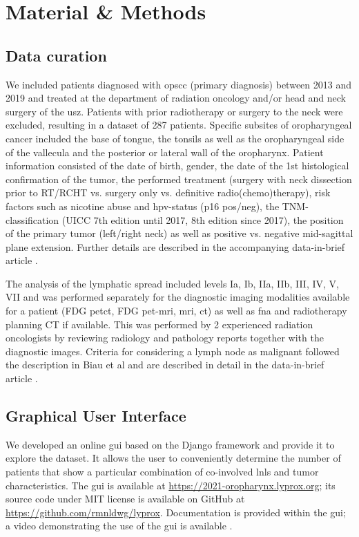 \documentclass[\relativeRoot/main.tex]{subfiles}
\begin{document}
\section{Material \& Methods}
\label{sec:dataset_usz:material}

\subsection*{Data curation}

We included patients diagnosed with \gls{opscc} (primary diagnosis) between 2013 and 2019 and treated at the department of radiation oncology and/or head and neck surgery of the \gls{usz}. Patients with prior radiotherapy or surgery to the neck were excluded, resulting in a dataset of 287 patients. Specific subsites of oropharyngeal cancer included the base of tongue, the tonsils as well as the oropharyngeal side of the vallecula and the posterior or lateral wall of the oropharynx. Patient information consisted of the date of birth, gender, the date of the 1st histological confirmation of the tumor, the performed treatment (surgery with neck dissection prior to RT/RCHT vs. surgery only vs. definitive radio(chemo)therapy), risk factors such as nicotine abuse and \gls{hpv}-status (p16 pos/neg), the TNM-classification (UICC 7th edition until 2017, 8th edition since 2017), the position of the primary tumor (left/right neck) as well as positive vs. negative mid-sagittal plane extension. Further details are described in the accompanying data-in-brief article \cite{ludwig_dataset_2022}.

The analysis of the lymphatic spread included levels Ia, Ib, IIa, IIb, III, IV, V, VII and was performed separately for the diagnostic imaging modalities available for a patient (FDG \acrshort{pet}\acrshort{ct}, FDG \acrshort{pet}-\gls{mri}, \gls{mri}, \gls{ct}) as well as \gls{fna} and radiotherapy planning CT if available. This was performed by 2 experienced radiation oncologists by reviewing radiology and pathology reports together with the diagnostic images. Criteria for considering a lymph node as malignant followed the description in Biau et al \cite{biau_selection_2019} and are described in detail in the data-in-brief article \cite{ludwig_dataset_2022}.



\subsection*{Graphical User Interface}

We developed an online \gls{gui} based on the Django framework \cite{noauthor_django_2022} and provide it to explore the dataset. It allows the user to conveniently determine the number of patients that show a particular combination of co-involved \glspl{lnl} and tumor characteristics. The \gls{gui} is available at \url{https://2021-oropharynx.lyprox.org}; its source code under MIT license is available on GitHub at \url{https://github.com/rmnldwg/lyprox}. Documentation is provided within the \gls{gui}; a video demonstrating the use of the \gls{gui} is available .
\end{document}
